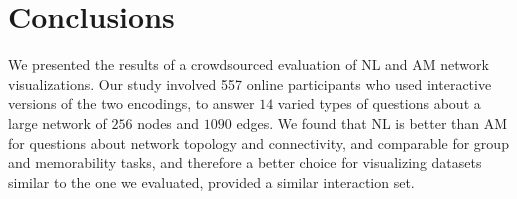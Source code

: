 \section{Conclusions}

We presented the results of a crowdsourced evaluation of NL and AM network visualizations. Our study involved 557 online participants who used interactive versions of the two encodings, to answer $14$ varied types of questions about a large network of $256$ nodes and $1090$ edges. We found that NL is better than AM for questions about network topology and connectivity, and comparable for group and memorability tasks, and therefore a better choice
for visualizing datasets similar to the one we evaluated, provided a similar interaction set.


